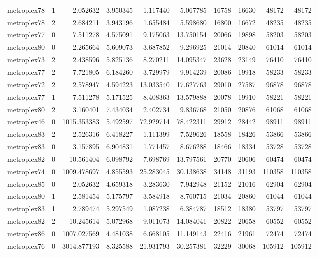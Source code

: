\begin{longtable}{|l|r|r|r|r|r|r|r|r|r|}
metroplex78 & 1 & 2.052632 & 3.950345 & 1.117440 & 5.067785 & 16758 & 16630 & 48172 & 48172 \\
metroplex78 & 2 & 2.684211 & 3.943196 & 1.655484 & 5.598680 & 16800 & 16672 & 48235 & 48235 \\
metroplex77 & 0 & 7.511278 & 4.575091 & 9.175063 & 13.750154 & 20066 & 19898 & 58203 & 58203 \\
metroplex80 & 0 & 2.265664 & 5.609073 & 3.687852 & 9.296925 & 21014 & 20840 & 61014 & 61014 \\
metroplex73 & 2 & 2.438596 & 5.825136 & 8.270211 & 14.095347 & 23628 & 23149 & 76410 & 76410 \\
metroplex77 & 2 & 7.721805 & 6.184260 & 3.729979 & 9.914239 & 20086 & 19918 & 58233 & 58233 \\
metroplex72 & 2 & 2.578947 & 4.594223 & 13.033540 & 17.627763 & 29010 & 27587 & 96878 & 96878 \\
metroplex77 & 1 & 7.511278 & 5.171525 & 8.408363 & 13.579888 & 20078 & 19910 & 58221 & 58221 \\
metroplex80 & 2 & 3.160401 & 7.434034 & 2.402734 & 9.836768 & 21050 & 20876 & 61068 & 61068 \\
metroplex46 & 0 & 1015.353383 & 5.492597 & 72.929714 & 78.422311 & 29912 & 28442 & 98911 & 98911 \\
metroplex83 & 2 & 2.526316 & 6.418227 & 1.111399 & 7.529626 & 18558 & 18426 & 53866 & 53866 \\
metroplex83 & 0 & 3.157895 & 6.904831 & 1.771457 & 8.676288 & 18466 & 18334 & 53728 & 53728 \\
metroplex82 & 0 & 10.561404 & 6.098792 & 7.698769 & 13.797561 & 20770 & 20606 & 60474 & 60474 \\
metroplex74 & 0 & 1009.478697 & 4.855593 & 25.283045 & 30.138638 & 34148 & 31193 & 110358 & 110358 \\
metroplex85 & 0 & 2.052632 & 4.659318 & 3.283630 & 7.942948 & 21152 & 21016 & 62904 & 62904 \\
metroplex80 & 1 & 2.581454 & 5.175797 & 3.584918 & 8.760715 & 21034 & 20860 & 61044 & 61044 \\
metroplex83 & 1 & 2.789474 & 5.297549 & 1.087238 & 6.384787 & 18512 & 18380 & 53797 & 53797 \\
metroplex82 & 2 & 10.245614 & 5.072968 & 9.011073 & 14.084041 & 20822 & 20658 & 60552 & 60552 \\
metroplex86 & 0 & 1007.027569 & 4.481038 & 6.668105 & 11.149143 & 22416 & 21961 & 72474 & 72474 \\
metroplex76 & 0 & 3014.877193 & 8.325588 & 21.931793 & 30.257381 & 32229 & 30068 & 105912 & 105912 \\

\end{longtable}
